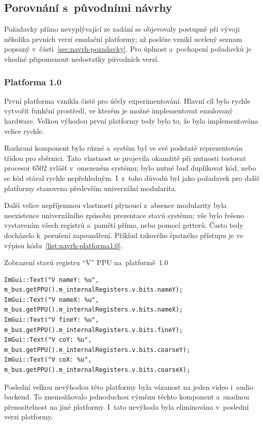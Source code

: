 \subsection{Porovnání s~původními návrhy}
Požadavky přímo nevyplývající ze zadání se objevovaly postupně při vývoji několika prvních verzí emulační platformy; až posléze vznikl ucelený seznam popsaný v~části~\ref{sec:navrh-pozadavky}. Pro úplnost a~pochopení požadavků je vhodné připomenout nedostatky původních verzí.

\subsubsection{Platforma 1.0}
První platforma vznikla čistě pro účely experimentování. Hlavní cíl bylo rychle vytvořit funkční prostředí, ve kterém je možné implementovat emulovaný hardware. Velkou výhodou první platformy tedy bylo to, že byla implementována velice rychle.

Rozhraní komponent bylo různé a~systém byl ve své podstatě reprezentován třídou pro sběrnici. Tato vlastnost se projevila okamžitě při nutnosti testovat procesor 6502 zvlášť v~omezeném systému; bylo nutné buď duplikovat kód, nebo se kód stával rychle nepřehledným. I~z~toho důvodů byl jako požadavek pro další platformy stanovena především univerzální modularita.

Další velice nepříjemnou vlastností plynoucí z~absence modularity byla neexistence univerzálního způsobu prezentace stavů systému; vše bylo řešeno vystavením všech registrů a~pamětí přímo, nebo pomocí getterů. Často tedy docházelo k~porušení zapouzdření. Příklad takového špatného přístupu je ve výpisu kódu~\ref{list:navrh-platforma1.0}.

\begin{listing}
	\caption{Zobrazení stavů registru \enquote{V} PPU na~platformě~1.0}
	\label{list:navrh-platforma1.0}
	\begin{verbatim}
ImGui::Text("V nameY: %u", m_bus.getPPU().m_internalRegisters.v.bits.nameY);
ImGui::Text("V nameX: %u", m_bus.getPPU().m_internalRegisters.v.bits.nameX);
ImGui::Text("V fineY: %u", m_bus.getPPU().m_internalRegisters.v.bits.fineY);
ImGui::Text("V coY: %u",   m_bus.getPPU().m_internalRegisters.v.bits.coarseY);
ImGui::Text("V coX: %u",   m_bus.getPPU().m_internalRegisters.v.bits.coarseX);
	\end{verbatim}
\end{listing}

Poslední velkou nevýhodou této platformy byla vázanost na jeden video i~audio backend. To znemožňovalo jednoduchou výměnu těchto komponent a~snadnou přenositelnost na jiné platformy. I~tato nevýhoda byla eliminována v~poslední verzi platformy.

